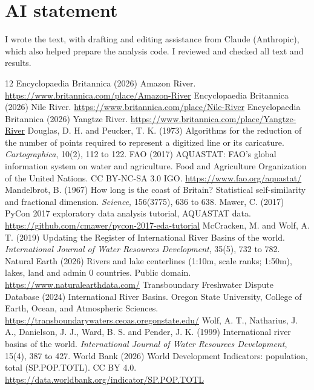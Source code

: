 \documentclass[11pt,a4paper]{article}
\begin{document}
\section*{AI statement}
I wrote the text, with drafting and editing assistance from Claude (Anthropic), which also helped prepare the analysis code. I reviewed and checked all text and results.

\begin{thebibliography}{12}
 Encyclopaedia Britannica (2026) Amazon River. \url{https://www.britannica.com/place/Amazon-River}
 Encyclopaedia Britannica (2026) Nile River. \url{https://www.britannica.com/place/Nile-River}
 Encyclopaedia Britannica (2026) Yangtze River. \url{https://www.britannica.com/place/Yangtze-River}
 Douglas, D. H. and Peucker, T. K. (1973) Algorithms for the reduction of the number of points required to represent a digitized line or its caricature. \emph{Cartographica}, 10(2), 112 to 122.
 FAO (2017) AQUASTAT: FAO's global information system on water and agriculture. Food and Agriculture Organization of the United Nations. CC BY-NC-SA 3.0 IGO. \url{https://www.fao.org/aquastat/}
 Mandelbrot, B. (1967) How long is the coast of Britain? Statistical self-similarity and fractional dimension. \emph{Science}, 156(3775), 636 to 638.
 Mawer, C. (2017) PyCon 2017 exploratory data analysis tutorial, AQUASTAT data. \url{https://github.com/cmawer/pycon-2017-eda-tutorial}
 McCracken, M. and Wolf, A. T. (2019) Updating the Register of International River Basins of the world. \emph{International Journal of Water Resources Development}, 35(5), 732 to 782.
 Natural Earth (2026) Rivers and lake centerlines (1:10m, scale ranks; 1:50m), lakes, land and admin 0 countries. Public domain. \url{https://www.naturalearthdata.com/}
 Transboundary Freshwater Dispute Database (2024) International River Basins. Oregon State University, College of Earth, Ocean, and Atmospheric Sciences. \url{https://transboundarywaters.ceoas.oregonstate.edu/}
 Wolf, A. T., Natharius, J. A., Danielson, J. J., Ward, B. S. and Pender, J. K. (1999) International river basins of the world. \emph{International Journal of Water Resources Development}, 15(4), 387 to 427.
 World Bank (2026) World Development Indicators: population, total (SP.POP.TOTL). CC BY 4.0. \url{https://data.worldbank.org/indicator/SP.POP.TOTL}
\end{thebibliography}
\end{document}
